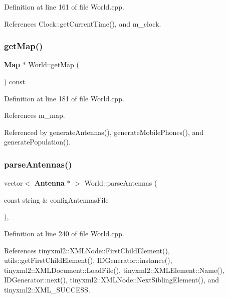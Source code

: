 Definition at line 161 of file World.\+cpp.



References Clock\+::get\+Current\+Time(), and m\+\_\+clock.

\mbox{\label{class_world_a5b82e6105d8f4b3d757eb7da6d65205a}} 
\subsubsection{getMap()}
{\footnotesize\ttfamily \textbf{ Map} $\ast$ World\+::get\+Map (\begin{DoxyParamCaption}{ }\end{DoxyParamCaption}) const}



Definition at line 181 of file World.\+cpp.



References m\+\_\+map.



Referenced by generate\+Antennas(), generate\+Mobile\+Phones(), and generate\+Population().

\mbox{\label{class_world_aaf31e06b9b5a40a4338164e0f641f7d0}} 
\subsubsection{parseAntennas()}
{\footnotesize\ttfamily vector$<$ \textbf{ Antenna} $\ast$ $>$ World\+::parse\+Antennas (\begin{DoxyParamCaption}\item[{const string \&}]{config\+Antennas\+File }\end{DoxyParamCaption})\hspace{0.3cm}{\ttfamily [private]}, {\ttfamily [noexcept]}}



Definition at line 240 of file World.\+cpp.



References tinyxml2\+::\+X\+M\+L\+Node\+::\+First\+Child\+Element(), utils\+::get\+First\+Child\+Element(), I\+D\+Generator\+::instance(), tinyxml2\+::\+X\+M\+L\+Document\+::\+Load\+File(), tinyxml2\+::\+X\+M\+L\+Element\+::\+Name(), I\+D\+Generator\+::next(), tinyxml2\+::\+X\+M\+L\+Node\+::\+Next\+Sibling\+Element(), and tinyxml2\+::\+X\+M\+L\+\_\+\+S\+U\+C\+C\+E\+SS.

\mbox{\label{class_world_a8bdce1dbc8d7a653d63a59674e283622}} 
